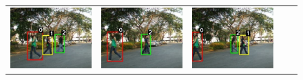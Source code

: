 \begin{frame}
\begin{figure}
\begin{tabular}{ccccc}
            \includegraphics[scale=0.17]{figures/normal-tracking-result-0103} &
            \includegraphics[scale=0.17]{figures/normal-tracking-result-0110} &
            \includegraphics[scale=0.17]{figures/normal-tracking-result-0116} 

\end{tabular}
\end{figure}
\end{frame}
